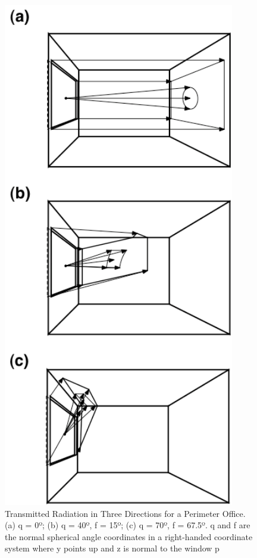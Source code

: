 \begin{figure}[hbtp] %
\centering
\includegraphics[width=0.9\textwidth, height=0.9\textheight, keepaspectratio=true]{media/image1326.png}
\caption{Transmitted Radiation in Three Directions for a Perimeter Office. (a) q = 0º; (b) q = 40º, f = 15º; (c) q = 70º, f = 67.5º.  q and f are the normal spherical angle coordinates in a right-handed coordinate system where y points up and z is normal to the window p \protect \label{fig:transmitted-radiation-in-three-directions-for}}
\end{figure}

